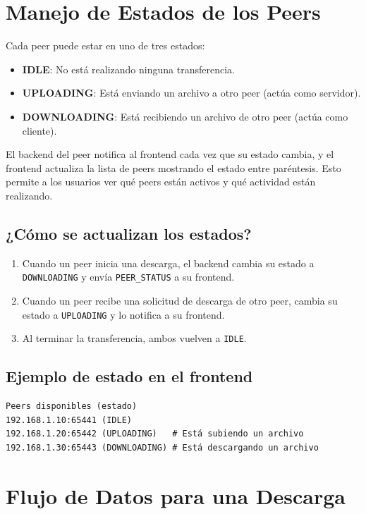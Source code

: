 \documentclass[12pt]{article}
\begin{document}
\section{Manejo de Estados de los Peers}

Cada peer puede estar en uno de tres estados:

\begin{itemize}
    \item \textbf{IDLE}: No está realizando ninguna transferencia.
    \item \textbf{UPLOADING}: Está enviando un archivo a otro peer (actúa como servidor).
    \item \textbf{DOWNLOADING}: Está recibiendo un archivo de otro peer (actúa como cliente).
\end{itemize}

El backend del peer notifica al frontend cada vez que su estado cambia, y el frontend actualiza la lista de peers mostrando el estado entre paréntesis. Esto permite a los usuarios ver qué peers están activos y qué actividad están realizando.

\subsection{¿Cómo se actualizan los estados?}
\begin{enumerate}
    \item Cuando un peer inicia una descarga, el backend cambia su estado a \texttt{DOWNLOADING} y envía \texttt{PEER\_STATUS} a su frontend.
    \item Cuando un peer recibe una solicitud de descarga de otro peer, cambia su estado a \texttt{UPLOADING} y lo notifica a su frontend.
    \item Al terminar la transferencia, ambos vuelven a \texttt{IDLE}.
\end{enumerate}

\subsection{Ejemplo de estado en el frontend}
\begin{verbatim}
Peers disponibles (estado)
192.168.1.10:65441 (IDLE)
192.168.1.20:65442 (UPLOADING)   # Está subiendo un archivo
192.168.1.30:65443 (DOWNLOADING) # Está descargando un archivo
\end{verbatim}

\section{Flujo de Datos para una Descarga}
\end{document}
